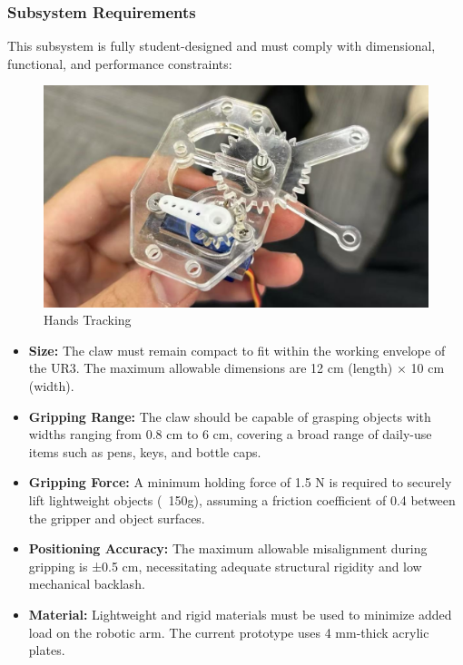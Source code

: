 \documentclass{senior-design}
\begin{document}
\subsubsection*{Subsystem Requirements}
This subsystem is fully student-designed and must comply with dimensional, functional, and performance constraints: 
\begin{figure}[H]
    \centering
    \includegraphics[width=0.6\linewidth]{Claw Test.png}
    \caption{Hands Tracking}
\end{figure}
\begin{itemize}
    \item \textbf{Size:} The claw must remain compact to fit within the working envelope of the UR3. The maximum allowable dimensions are 12 cm (length) × 10 cm (width). 
    \item \textbf{Gripping Range:} The claw should be capable of grasping objects with widths ranging from 0.8 cm to 6 cm, covering a broad range of daily-use items such as pens, keys, and bottle caps. 
    \item \textbf{Gripping Force:} A minimum holding force of 1.5 N is required to securely lift lightweight objects (~150g), assuming a friction coefficient of 0.4 between the gripper and object surfaces. 
    \item \textbf{Positioning Accuracy:} The maximum allowable misalignment during gripping is ±0.5 cm, necessitating adequate structural rigidity and low mechanical backlash. 
    \item \textbf{Material:} Lightweight and rigid materials must be used to minimize added load on the robotic arm. The current prototype uses 4 mm-thick acrylic plates. 
\end{itemize}
\end{document}
